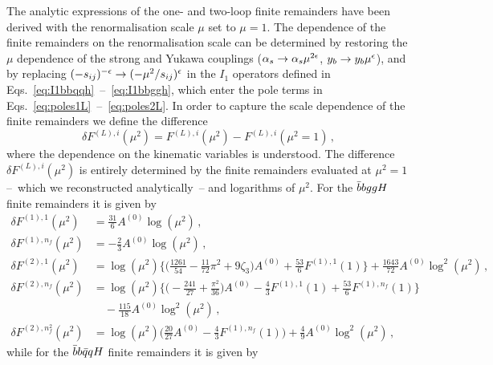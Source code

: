 \documentclass[main.tex]{subfiles}
\begin{document}
The analytic expressions of the one- and two-loop finite remainders have been derived with the renormalisation scale $\mu$ set to $\mu  = 1$. 
The dependence of the finite remainders on the renormalisation scale can be determined by restoring the $\mu$ dependence of the strong and Yukawa couplings ($\alpha_s \rightarrow \alpha_s \mu^{2\epsilon}$, 
$y_b \rightarrow y_b \mu^{\epsilon}$), and by replacing $(-s_{ij})^{-\epsilon} \rightarrow (-\mu^2/s_{ij})^\epsilon$ in the $I_1$ operators defined in Eqs.~\eqref{eq:I1bbqqh}~--~\eqref{eq:I1bbggh}, which enter the pole terms in Eqs.~\eqref{eq:poles1L}~--~\eqref{eq:poles2L}. In order to capture the scale dependence of the finite remainders we define the difference
\begin{equation}
\delta F^{(L),i}(\mu^2) = F^{(L),i}(\mu^2) - F^{(L),i}(\mu^2 = 1) \,,
\end{equation}
where the dependence on the kinematic variables is understood.
The difference $\delta F^{(L),i}(\mu^2)$ is entirely determined by the finite remainders evaluated at $\mu^2=1$ --~which we reconstructed analytically~-- and logarithms of $\mu^2$.
For the $\bar{b}bggH$ finite remainders it is given by
\begingroup
\allowdisplaybreaks
\begin{align}
\delta F^{(1),1}(\mu^2)   & = \frac{31}{6} A^{(0)} \log(\mu^2) \,, \\
\delta F^{(1),n_f}(\mu^2) & = - \frac{2}{3} A^{(0)} \log(\mu^2) \,, \\
\delta F^{(2),1}(\mu^2) & = \log(\mu^2) \bigg\lbrace \bigg(\frac{1261}{54} - \frac{11}{72}\pi^2 + 9 \zeta_3\bigg) A^{(0)} + \frac{53}{6}F^{(1),1}(1) \bigg\rbrace
                             + \frac{1643}{72} A^{(0)} \log^2(\mu^2) \,, \\
\delta F^{(2),n_f}(\mu^2) & = \log(\mu^2) \bigg\lbrace \bigg(-\frac{241}{27} + \frac{\pi^2}{36} \bigg) A^{(0)} 
                                                                 - \frac{4}{3}F^{(1),1}(1)  + \frac{53}{6}F^{(1),n_f}(1) \bigg\rbrace \nonumber \\
                            & \quad - \frac{115}{18} A^{(0)} \log^2(\mu^2)  \,, \\
\delta F^{(2),n_f^2}(\mu^2) & = \log(\mu^2)\bigg(\frac{20}{27} A^{(0)} - \frac{4}{3} F^{(1),n_f}(1)\bigg) + \frac{4}{9} A^{(0)} \log^2(\mu^2) \,, 
\end{align}
\endgroup
while for the $\bar{b}b\bar{q}qH$ finite remainders it is given by
\begingroup
\allowdisplaybreaks
\end{document}

